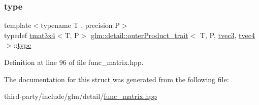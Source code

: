 \subsubsection{\texorpdfstring{type}{type}}
{\footnotesize\ttfamily template$<$typename T , precision P$>$ \\
typedef \hyperlink{structglm_1_1detail_1_1tmat3x4}{tmat3x4}$<$T, P$>$ \hyperlink{structglm_1_1detail_1_1outer_product__trait}{glm\+::detail\+::outer\+Product\+\_\+trait}$<$ T, P, \hyperlink{structglm_1_1detail_1_1tvec3}{tvec3}, \hyperlink{structglm_1_1detail_1_1tvec4}{tvec4} $>$\+::\hyperlink{structglm_1_1detail_1_1outer_product__trait_3_01_t_00_01_p_00_01tvec3_00_01tvec4_01_4_a14958bc1241fffaf223abab70496c56d}{type}}



Definition at line 96 of file func\+\_\+matrix.\+hpp.



The documentation for this struct was generated from the following file\+:\begin{DoxyCompactItemize}
\item 
third-\/party/include/glm/detail/\hyperlink{func__matrix_8hpp}{func\+\_\+matrix.\+hpp}\end{DoxyCompactItemize}

